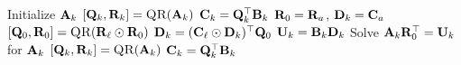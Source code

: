 
\begin{algorithmic}[1]
        \State Initialize $\mathbf{A}_k$
        \State $[\mat{Q}_k,\mat{R}_k] = \Call{QR}{\mat{A}_k}$  
        \State $\mathbf{C}_k = \mathbf{Q}_k^\top\mathbf{B}_k$   
      \EndFor
           
          \State $\mathbf{R}_0 = \mathbf{R}_a$, $\mathbf{D}_k = \mathbf{C}_a$ 
              \State $[\mat{Q}_0,\mat{R}_0] = \Call{QR}{\mat{R}_\ell \odot \mat{R}_0}$ \label{l:pair-QR-R} 
              \State $\mathbf{D}_k = (\mathbf{C}_\ell \odot \mathbf{D}_k)^\top\mathbf{Q}_0$ \label{l:pair-QR-Rapply} 
            \EndIf
          \EndFor
          \State $\mathbf{U}_k = \mathbf{B}_k\mathbf{D}_k$ \label{l:Pair-K-matmul} 
          \State Solve $  \mathbf{A}_k\mathbf{R}_0^\top = \mathbf{U}_k$ for $\mathbf{A}_k$ \label{l:Pair-K-solve}     
          \State $[\mat{Q}_k,\mat{R}_k] = \Call{QR}{\mat{A}_k}$ \label{l:Pair-K-update}    
          \State $\mathbf{C}_k = \mathbf{Q}_k^\top\mathbf{B}_k$ \label{l:Pair-K-apply}   
        \EndFor
      \EndWhile
    \EndFunction
  \end{algorithmic}